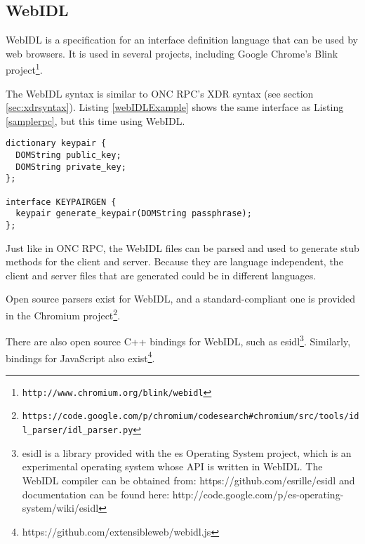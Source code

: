 \subsection{WebIDL}
WebIDL is a specification \cite{webidlw3c} for an interface definition language that can be used by web browsers. It is used in several projects, including Google Chrome's Blink project\footnote{\lstinline{http://www.chromium.org/blink/webidl}}.

The WebIDL syntax is similar to ONC RPC's XDR syntax (see section \ref{sec:xdrsyntax}). Listing \ref{webIDLExample} shows the same interface as Listing \ref{samplerpc}, but this time using WebIDL.

\begin{lstlisting}
dictionary keypair {
  DOMString public_key;
  DOMString private_key;
};

interface KEYPAIRGEN {
  keypair generate_keypair(DOMString passphrase);
};
\end{lstlisting}

Just like in ONC RPC, the WebIDL files can be parsed and used to generate stub methods for the client and server. Because they are language independent, the client and server files that are generated could be in different languages. 

Open source parsers exist for WebIDL, and a standard-compliant one is provided in the Chromium project\footnote{\lstinline+https://code.google.com/p/chromium/codesearch#chromium/src/tools/idl_parser/idl_parser.py+}. 

There are also open source C++ bindings for WebIDL, such as esidl\footnote{esidl is a library provided with the es Operating System project, which is an experimental operating system whose API is written in WebIDL. The WebIDL compiler can be obtained from: https://github.com/esrille/esidl and documentation can be found here: http://code.google.com/p/es-operating-system/wiki/esidl}. Similarly, bindings for JavaScript also exist\footnote{https://github.com/extensibleweb/webidl.js}. 

